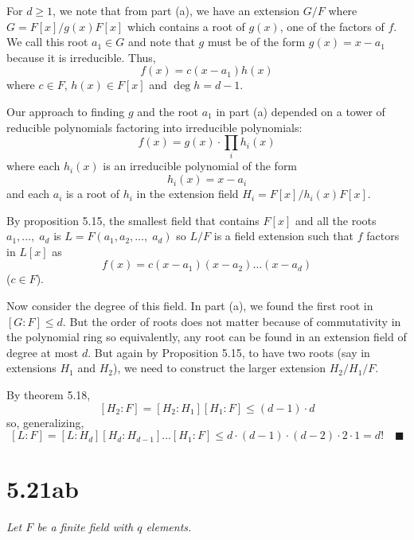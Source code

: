 \documentclass[12pt]{article}
\newcommand{\qed}{\quad \blacksquare}
\begin{document}
\begin{enumerate}[label=(\alph*)]
            For $d \geq 1$, we note that from part (a), we have an extension $G/F$ where $G = F[x]/g(x)F[x]$ which contains a root of $g(x)$, one of the factors of $f$. We call this root $a_1 \in G$ and note that $g$ must be of the form $g(x) = x - a_1$ because it is irreducible. Thus, 
            \[f(x) = c(x - a_1)h(x)\]
            where $c \in F$, $h(x) \in F[x]$ and $\deg h = d - 1$. 

            Our approach to finding $g$ and the root $a_1$ in part (a) depended on a tower of reducible polynomials factoring into irreducible polynomials:
            \[f(x) = g(x) \cdot \prod_{i} h_i(x)\]
            where each $h_i(x)$ is an irreducible polynomial of the form 
            \[h_i(x) = x - a_i\] 
            and each $a_i$ is a root of $h_i$ in the extension field $H_i = F[x]/h_i(x)F[x]$.

            By proposition 5.15, the smallest field that contains $F[x]$ and all the roots $a_1, \dots, \; a_d$ is $L = F(a_1, a_2, \dots,\; a_d)$ so $L/F$ is a field extension such that $f$ factors in $L[x]$ as 
            \[f(x) = c(x - a_1)(x - a_2) \dots (x - a_d)\]
            ($c \in F$). 

            Now consider the degree of this field. In part (a), we found the first root in 
            $[G:F] \leq d$. But the order of roots does not matter because of commutativity in the polynomial ring so equivalently, any root can be found in an extension field of degree at most $d$. But again by Proposition 5.15, to have two roots (say in extensions $H_1$ and $H_2$), we need to construct the larger extension $H_2/H_1/F$.

            By theorem 5.18, 
            \[[H_2 : F] = [H_2 : H_1][H_1 : F] \leq (d-1)\cdot d\]
            so, generalizing, 
            \[[L :F] = [L:H_d][H_d : H_{d-1}]\dots[H_1:F] \leq d \cdot (d-1)\cdot (d-2)\cdot 2\cdot 1 = d! \qed\]
        \color{black}
\end{enumerate}
\pagebreak

\section*{5.21ab}
    \emph{Let $F$ be a finite field with $q$ elements.}
\end{document}
